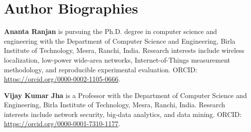 \documentclass[11pt,a4paper]{article}
\begin{document}
\section*{Author Biographies}
\noindent\textbf{Ananta Ranjan} is pursuing the Ph.D. degree in computer science and engineering with the Department of Computer Science and Engineering, Birla Institute of Technology, Mesra, Ranchi, India. Research interests include wireless localization, low-power wide-area networks, Internet-of-Things measurement methodology, and reproducible experimental evaluation. ORCID: \url{https://orcid.org/0000-0002-1105-0666}.

\noindent\textbf{Vijay Kumar Jha} is a Professor with the Department of Computer Science and Engineering, Birla Institute of Technology, Mesra, Ranchi, India. Research interests include network security, big-data analytics, and data mining. ORCID: \url{https://orcid.org/0000-0001-7310-1177}.

\endgroup
\end{document}
